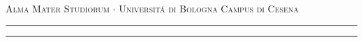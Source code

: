 \begin{titlepage}
    \begin{center}
        {
            \Large {
                \textsc{Alma Mater Studiorum $\cdot$ Universit\'a di Bologna}
                \textsc{Campus di Cesena}
            }
        }
        \rule[0.1cm]{15.8cm}{0.1mm}
        \rule[0.5cm]{15.8cm}{0.6mm}
    \end{center}
\end{titlepage}